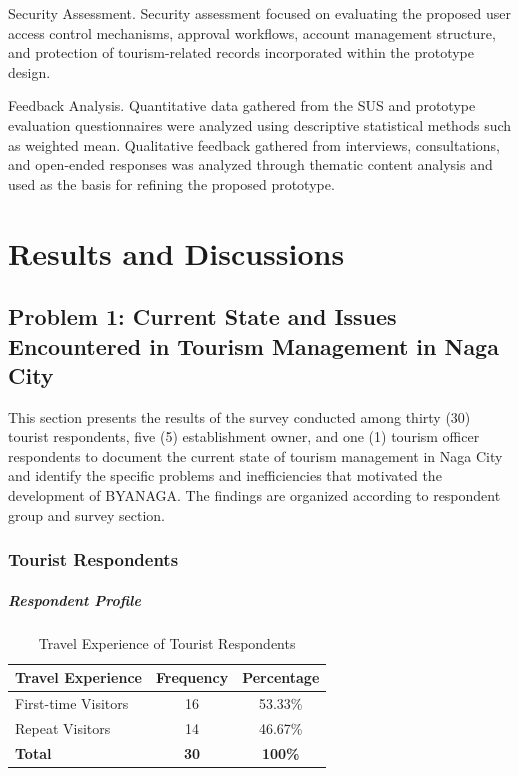 \documentclass{research}
\begin{document}
Security Assessment. Security assessment focused on evaluating the proposed user access control mechanisms, approval workflows, account management structure, and protection of tourism-related records incorporated within the prototype design.

Feedback Analysis. Quantitative data gathered from the SUS and prototype evaluation questionnaires were analyzed using descriptive statistical methods such as weighted mean. Qualitative feedback gathered from interviews, consultations, and open-ended responses was analyzed through thematic content analysis and used as the basis for refining the proposed prototype.

\chapter{Results and Discussions}

\section{Problem 1: Current State and Issues Encountered in Tourism 
Management in Naga City}

This section presents the results of the survey conducted among thirty (30) tourist 
respondents, five (5) establishment owner, and one (1) tourism officer respondents to document the current 
state of tourism management in Naga City and identify the specific problems and 
inefficiencies that motivated the development of BYANAGA. The findings are 
organized according to respondent group and survey section.

\subsection{Tourist Respondents}

\paragraph{Respondent Profile}

\begin{table}[h]
    \centering
    \begin{tabular}{|l|c|c|}
        \hline
        \textbf{Travel Experience} & \textbf{Frequency} & \textbf{Percentage} \\
        \hline
        First-time Visitors & 16 & 53.33\% \\
        Repeat Visitors     & 14 & 46.67\% \\
        \hline
        \textbf{Total} & \textbf{30} & \textbf{100\%} \\
        \hline
    \end{tabular}
    \caption{Travel Experience of Tourist Respondents}
    \label{tab:travel_experience}
\end{table}
\end{document}

